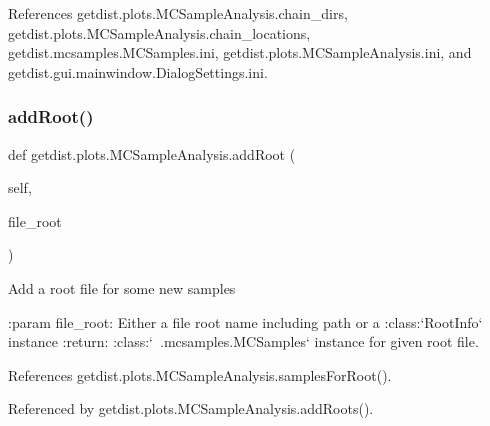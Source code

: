 References getdist.\+plots.\+M\+C\+Sample\+Analysis.\+chain\+\_\+dirs, getdist.\+plots.\+M\+C\+Sample\+Analysis.\+chain\+\_\+locations, getdist.\+mcsamples.\+M\+C\+Samples.\+ini, getdist.\+plots.\+M\+C\+Sample\+Analysis.\+ini, and getdist.\+gui.\+mainwindow.\+Dialog\+Settings.\+ini.

\mbox{\label{classgetdist_1_1plots_1_1MCSampleAnalysis_a66016ce12ceb418f0bdf2717f272e57a}} 
\subsubsection{\texorpdfstring{add\+Root()}{addRoot()}}
{\footnotesize\ttfamily def getdist.\+plots.\+M\+C\+Sample\+Analysis.\+add\+Root (\begin{DoxyParamCaption}\item[{}]{self,  }\item[{}]{file\+\_\+root }\end{DoxyParamCaption})}

\begin{DoxyVerb}Add a root file for some new samples

:param file_root: Either a file root name including path or a :class:`RootInfo` instance
:return: :class:`~.mcsamples.MCSamples` instance for given root file.
\end{DoxyVerb}
 

References getdist.\+plots.\+M\+C\+Sample\+Analysis.\+samples\+For\+Root().



Referenced by getdist.\+plots.\+M\+C\+Sample\+Analysis.\+add\+Roots().

